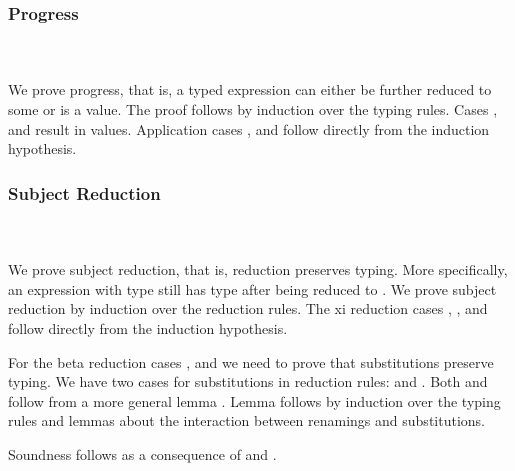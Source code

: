 \subsubsection{Progress}\hfill\\\\
We prove progress, that is, a typed expression  can either be further reduced to some  or  is a value. The proof follows by induction over the typing rules. 
\FProgress
Cases ,  and  result in values. Application cases ,  and  follow directly from the induction hypothesis. 
\subsubsection{Subject Reduction}\hfill\\\\
We prove subject reduction, that is, reduction preserves typing. More specifically, an expression  with type  still has type  after being reduced to . We prove subject reduction by induction over the reduction rules. 
\FSubjectReduction
The xi reduction cases , ,  and  follow directly from the induction hypothesis. 

\noindent For the beta reduction cases ,  and  we need to prove that substitutions preserve typing. We have two cases for substitutions in reduction rules:  \Data{[}  \Data{]} and  \Data{[}  \Data{]}.
Both  and  follow from a more general lemma . 
\Fpreserves
Lemma  follows by induction over the typing rules and lemmas about the interaction between renamings and substitutions. 

\noindent Soundness follows as a consequence of  and . 